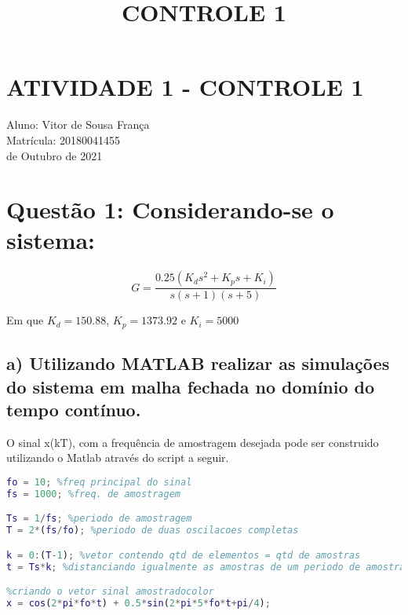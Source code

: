 \documentclass{article}
\title{CONTROLE 1}
\begin{document}
\section*{ATIVIDADE 1 - CONTROLE 1}

\indent Aluno: Vitor de Sousa França\\
\indent Matrícula: 20180041455\\
 de Outubro de 2021\\

\section*{Questão 1: Considerando-se o sistema:  }
    \begin{equation*}
        G = \frac{0.25(K_d s^2 + K_p s +K_i)}{s(s+1)(s+5)}
    \end{equation*}
    
    Em que $K_d = 150.88$, $K_p = 1373.92$ e $K_i = 5000$
    
    \subsection*{a) Utilizando MATLAB realizar as simulações do sistema em malha fechada no domínio do tempo contínuo.}

O sinal x(kT), com a frequência de amostragem desejada pode ser construido utilizando o Matlab através do script a seguir.

\begin{lstlisting}[language=Matlab,caption='Primeira Simulação']
%% Q1 a)
fo = 10; %freq principal do sinal
fs = 1000; %freq. de amostragem

Ts = 1/fs; %periodo de amostragem
T = 2*(fs/fo); %periodo de duas oscilacoes completas

k = 0:(T-1); %vetor contendo qtd de elementos = qtd de amostras
t = Ts*k; %distanciando igualmente as amostras de um periodo de amostragem

%criando o vetor sinal amostradocolor
x = cos(2*pi*fo*t) + 0.5*sin(2*pi*5*fo*t+pi/4);
\end{lstlisting}
\end{document}

